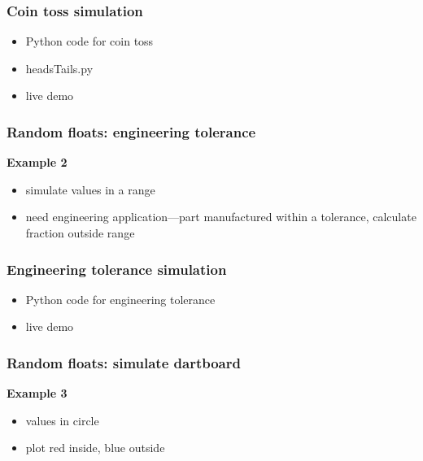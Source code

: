 \documentclass[english,14pt]{beamer}
\begin{document}

\begin{frame}[fragile]

\frametitle{Coin toss simulation}

\begin{itemize}
	\item Python code for coin toss
	\item headsTails.py
	\item live demo
\end{itemize}

\end{frame}


\begin{frame}[fragile]

\frametitle{Random floats: engineering tolerance}

\textbf{Example 2}\\
\vspace*{5mm}
\begin{itemize}
	\item simulate values in a range
	\item need engineering application---part manufactured within a tolerance, calculate fraction outside range
\end{itemize}

\end{frame}


\begin{frame}[fragile]

\frametitle{Engineering tolerance simulation}

\begin{itemize}
	\item Python code for engineering tolerance
	\item live demo
\end{itemize}

\end{frame}


\begin{frame}[fragile]

\frametitle{Random floats: simulate dartboard}

\textbf{Example 3}\\
\vspace*{5mm}
\begin{itemize}
	\item values in circle
	\item plot red inside, blue outside
\end{itemize}

\end{frame}
\end{document}
